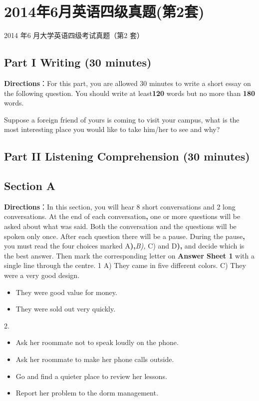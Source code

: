 \documentclass[UTF8,11pt]{ctexart}
\begin{document}
\section*{2014年6月英语四级真题(第2套)}
2014 年6 月大学英语四级考试真题（第2 套）


\subsection*{\textbf{Part I} \textbf{Writing} \textbf{(30 minutes)}}


\textbf{Directions}：For this part, you are allowed 30 minutes to write a short essay on the following question. You should write at least\textbf{120} words but no more than \textbf{180} words.


Suppose a foreign friend of yours is coming to visit your campus, what is the most interesting place you would like to take him/her to see and why?


\subsection*{\textbf{Part II} \textbf{Listening Comprehension} \textbf{(30 minutes)}}


\subsection*{Section A}


\textbf{Directions}：In this section, you will hear 8 short conversations and 2 long conversations. At the end of each conversation\textbf{,} one or more questions will be asked about what was said. Both the conversation and the questions will be spoken only once. After each question there will be a pause. During the pause\textbf{,} you must read the four choices marked A\textbf{),}\textit{B),} C) and D\textbf{),} and decide which is the best answer. Then mark the corresponding letter on \textbf{Answer Sheet 1} with a single line through the centre. 1 A) They came in five different colors. C) They were a very good design.


\begin{itemize}[leftmargin=2em,itemsep=.2em,topsep=.4em]\item[B.] They were good value for money.
\item[D.] They were sold out very quickly.
\end{itemize}

2.


\begin{itemize}[leftmargin=2em,itemsep=.2em,topsep=.4em]\item[A.] Ask her roommate not to speak loudly on the phone.
\item[B.] Ask her roommate to make her phone calls outside.
\item[C.] Go and find a quieter place to review her lessons.
\item[D.] Report her problem to the dorm management.
\end{itemize}
\end{document}
